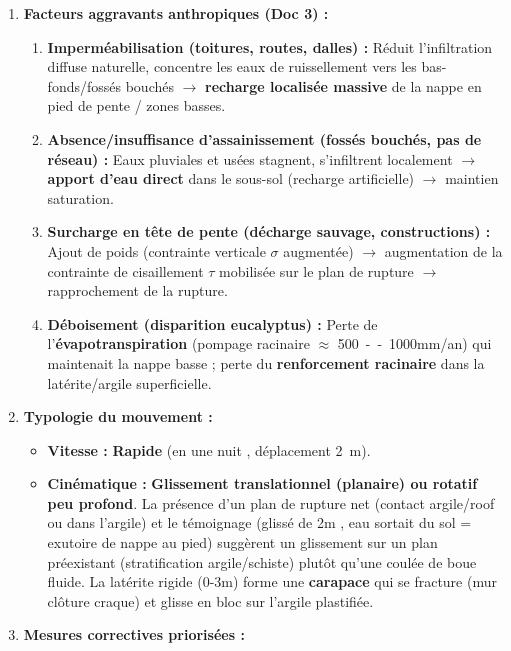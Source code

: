 \documentclass[11pt]{article}
\begin{document}
\begin{exercice}
\begin{enumerate}
\item \textbf{Facteurs aggravants anthropiques (Doc 3) :}
      \begin{enumerate}
      \item \textbf{Imperméabilisation (toitures, routes, dalles) :} Réduit l'infiltration diffuse naturelle, concentre les eaux de ruissellement vers les bas-fonds/fossés bouchés $\rightarrow$ \textbf{recharge localisée massive} de la nappe en pied de pente / zones basses.
      \item \textbf{Absence/insuffisance d'assainissement (fossés bouchés, pas de réseau) :} Eaux pluviales et usées stagnent, s'infiltrent localement $\rightarrow$ \textbf{apport d'eau direct} dans le sous-sol (recharge artificielle) $\rightarrow$ maintien saturation.
      \item \textbf{Surcharge en tête de pente (décharge sauvage, constructions) :} Ajout de poids (contrainte verticale $\sigma$ augmentée) $\rightarrow$ augmentation de la contrainte de cisaillement $\tau$ mobilisée sur le plan de rupture $\rightarrow$ rapprochement de la rupture.
      \item \textbf{Déboisement (disparition eucalyptus) :} Perte de l'\textbf{évapotranspiration} (pompage racinaire $\approx$ \SI{500}{--1000}{mm/an}) qui maintenait la nappe basse ; perte du \textbf{renforcement racinaire} dans la latérite/argile superficielle.
      \end{enumerate}
\item \textbf{Typologie du mouvement :}
      \begin{itemize}
      \item \textbf{Vitesse :} \textbf{Rapide} (\og en une nuit \fg, déplacement \SI{2}{m}).
      \item \textbf{Cinématique :} \textbf{Glissement translationnel (planaire) ou rotatif peu profond}. La présence d'un plan de rupture net (contact argile/roof ou dans l'argile) et le témoignage (\og glissé de 2m \fg, \og eau sortait du sol \fg = exutoire de nappe au pied) suggèrent un glissement sur un plan préexistant (stratification argile/schiste) plutôt qu'une coulée de boue fluide. La latérite rigide (0-3m) forme une \textbf{carapace} qui se fracture (mur clôture craque) et glisse en bloc sur l'argile plastifiée.
      \end{itemize}
\item \textbf{Mesures correctives priorisées :}
      \begin{center}
      \begin{tabularx}{\linewidth}{|l|X|X|}\hline

\end{tabularx}
\end{center}
\end{enumerate}
\end{exercice}
\end{document}
